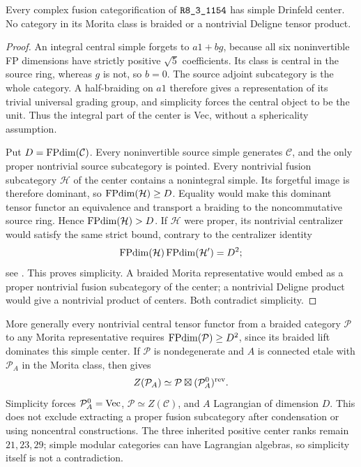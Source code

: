 \begin{proposition}
Every complex fusion categorification of $\sha{R8_3_1154}$ has simple
Drinfeld center. No category in its Morita class is braided or a
nontrivial Deligne tensor product.
\end{proposition}
\begin{proof}
An integral central simple forgets to $a1+bg$, because all six
noninvertible FP dimensions have strictly positive $\sqrt5$ coefficients.
Its class is central in the source ring, whereas $g$ is not, so $b=0$.
The source adjoint subcategory is the whole category. A half-braiding on
$a1$ therefore gives a representation of its trivial universal grading
group, and simplicity forces the central object to be the unit.
Thus the integral part of the center is Vec, without a sphericality
assumption.

Put $D=\FPdim(\mathcal C)$. Every noninvertible source simple generates
$\mathcal C$, and the only proper nontrivial source subcategory is
pointed. Every nontrivial fusion subcategory $\mathcal H$ of the center
contains a nonintegral simple. Its forgetful image is therefore dominant,
so $\FPdim(\mathcal H)\ge D$. Equality would make this dominant tensor
functor an equivalence and transport a braiding to the noncommutative
source ring. Hence $\FPdim(\mathcal H)>D$. If $\mathcal H$ were proper,
its nontrivial centralizer would satisfy the same strict bound, contrary
to the centralizer identity
\[
 \FPdim(\mathcal H)\FPdim(\mathcal H')=D^2;
\]
see \cite[Theorem~3.14]{DGNO}. This proves simplicity. A braided Morita
representative would embed as a proper nontrivial fusion subcategory of
the center; a nontrivial Deligne product would give a nontrivial product
of centers. Both contradict simplicity.
\end{proof}

More generally every nontrivial central tensor functor from a braided
category $\mathcal P$ to any Morita representative requires
$\FPdim(\mathcal P)\ge D^2$, since its braided lift dominates this simple
center. If $\mathcal P$ is nondegenerate and $A$ is connected etale with
$\mathcal P_A$ in the Morita class, then
\cite[Corollary~3.30]{DMNO} gives
\[
 Z(\mathcal P_A)\simeq\mathcal P\boxtimes(\mathcal P_A^0)^{\rm rev}.
\]
Simplicity forces $\mathcal P_A^0=\Vec$, $\mathcal P\simeq Z(\mathcal C)$,
and $A$ Lagrangian of dimension $D$. This does not exclude extracting a
proper fusion subcategory after condensation or using noncentral
constructions. The three inherited positive center ranks remain
$21,23,29$; simple modular categories can have Lagrangian algebras,
so simplicity itself is not a contradiction.

